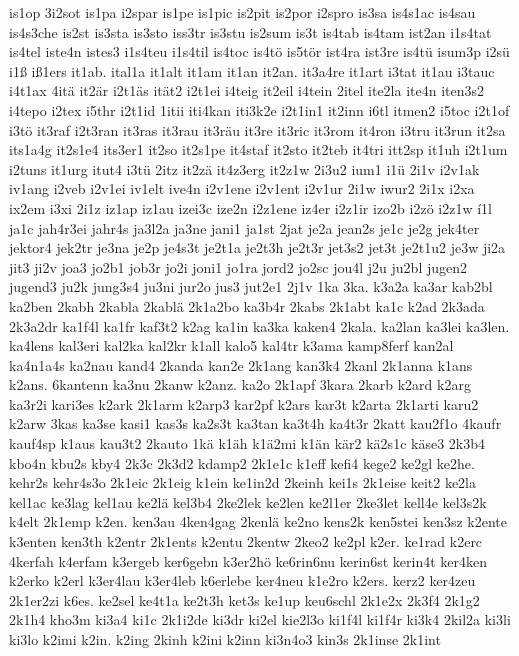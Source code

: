 {is1op
3i2sot
is1pa
i2spar
is1pe
is1pic
is2pit
is2por
i2spro
is3sa
is4s1ac
is4sau
is4s3che
is2st
is3sta
is3sto
iss3tr
is3stu
is2sum
is3t
is4tab
is4tam
ist2an
i1s4tat
is4tel
iste4n
istes3
i1s4teu
i1s4til
is4toc
is4tö
is5tör
ist4ra
ist3re
is4tü
isum3p
i2sü
i1ß
iß1ers
it1ab.
ital1a
it1alt
it1am
it1an
it2an.
it3a4re
it1art
i3tat
it1au
i3tauc
i4t1ax
4itä
it2är
i2t1äs
ität2
i2t1ei
i4teig
it2eil
i4tein
2itel
ite2la
ite4n
iten3s2
i4tepo
i2tex
i5thr
i2t1id
1itii
iti4kan
iti3k2e
i2t1in1
it2inn
i6tl
itmen2
i5toc
i2t1of
i3tö
it3raf
i2t3ran
it3ras
it3rau
it3räu
it3re
it3ric
it3rom
it4ron
i3tru
it3run
it2sa
its1a4g
it2s1e4
its3er1
it2so
it2s1pe
it4staf
it2sto
it2teb
it4tri
itt2sp
it1uh
i2t1um
i2tuns
it1urg
itut4
i3tü
2itz
it2zä
it4z3erg
it2z1w
2i3u2
ium1
i1ü
2i1v
i2v1ak
iv1ang
i2veb
i2v1ei
iv1elt
ive4n
i2v1ene
i2v1ent
i2v1ur
2i1w
iwur2
2i1x
i2xa
ix2em
i3xi
2i1z
iz1ap
iz1au
izei3c
ize2n
i2z1ene
iz4er
i2z1ir
izo2b
i2zö
i2z1w
í1l
ja1c
jah4r3ei
jahr4s
ja3l2a
ja3ne
jani1
ja1st
2jat
je2a
jean2s
je1c
je2g
jek4ter
jektor4
jek2tr
je3na
je2p
je4s3t
je2t1a
je2t3h
je2t3r
jet3s2
jet3t
je2t1u2
je3w
ji2a
jit3
ji2v
joa3
jo2b1
job3r
jo2i
joni1
jo1ra
jord2
jo2sc
jou4l
j2u
ju2bl
jugen2
jugend3
ju2k
jung3s4
ju3ni
jur2o
jus3
jut2e1
2j1v
1ka
3ka.
k3a2a
ka3ar
kab2bl
ka2ben
2kabh
2kabla
2kablä
2k1a2bo
ka3b4r
2kabs
2k1abt
ka1c
k2ad
2k3ada
2k3a2dr
ka1f4l
ka1fr
kaf3t2
k2ag
ka1in
ka3ka
kaken4
2kala.
ka2lan
ka3lei
ka3len.
ka4lens
kal3eri
kal2ka
kal2kr
k1all
kalo5
kal4tr
k3ama
kamp8ferf
kan2al
ka4n1a4s
ka2nau
kand4
2kanda
kan2e
2k1ang
kan3k4
2kanl
2k1anna
k1ans
k2ans.
6kantenn
ka3nu
2kanw
k2anz.
ka2o
2k1apf
3kara
2karb
k2ard
k2arg
ka3r2i
kari3es
k2ark
2k1arm
k2arp3
kar2pf
k2ars
kar3t
k2arta
2k1arti
karu2
k2arw
3kas
ka3se
kasi1
kas3s
ka2s3t
ka3tan
ka3t4h
ka4t3r
2katt
kau2f1o
4kaufr
kauf4sp
k1aus
kau3t2
2kauto
1kä
k1äh
k1ä2mi
k1än
kär2
kä2s1c
käse3
2k3b4
kbo4n
kbu2s
kby4
2k3c
2k3d2
kdamp2
2k1e1c
k1eff
kefi4
kege2
ke2gl
ke2he.
kehr2s
kehr4s3o
2k1eic
2k1eig
k1ein
ke1in2d
2keinh
kei1s
2k1eise
keit2
ke2la
kel1ac
ke3lag
kel1au
ke2lä
kel3b4
2ke2lek
ke2len
ke2l1er
2ke3let
kell4e
kel3s2k
k4elt
2k1emp
k2en.
ken3au
4ken4gag
2kenlä
ke2no
kens2k
ken5stei
ken3sz
k2ente
k3enten
ken3th
k2entr
2k1ents
k2entu
2kentw
2keo2
ke2pl
k2er.
ke1rad
k2erc
4kerfah
k4erfam
k3ergeb
ker6gebn
k3er2hö
ke6rin6nu
kerin6st
kerin4t
ker4ken
k2erko
k2erl
k3er4lau
k3er4leb
k6erlebe
ker4neu
k1e2ro
k2ers.
kerz2
ker4zeu
2k1er2zi
k6es.
ke2sel
ke4t1a
ke2t3h
ket3s
ke1up
keu6schl
2k1e2x
2k3f4
2k1g2
2k1h4
kho3m
ki3a4
ki1c
2k1i2de
ki3dr
ki2el
kie2l3o
ki1f4l
ki1f4r
ki3k4
2kil2a
ki3li
ki3lo
k2imi
k2in.
k2ing
2kinh
k2ini
k2inn
ki3n4o3
kin3s
2k1inse
2k1int
}
